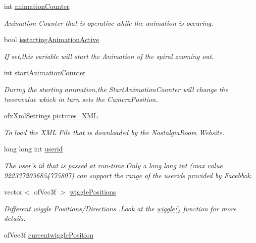 \begin{DoxyCompactItemize}
int \hyperlink{group___camera_ga21b16bdba744425519597fcb925df43a}{animation\-Counter}
\begin{DoxyCompactList}\small\item\em Animation Counter that is operative while the animation is occuring. \end{DoxyCompactList}\item 
bool \hyperlink{group___camera_gab8a277e1055730fb5d6786ce0c4804b2}{isstarting\-Animation\-Active}
\begin{DoxyCompactList}\small\item\em If set,this variable will start the Animation of the spiral zooming out. \end{DoxyCompactList}\item 
int \hyperlink{group___camera_ga577bf117cf10109de967ea0d3ca17f1f}{start\-Animation\-Counter}
\begin{DoxyCompactList}\small\item\em During the starting animation,the Start\-Animation\-Counter will change the tweenvalue which in turn sets the Camera\-Position. \end{DoxyCompactList}\item 
ofx\-Xml\-Settings \hyperlink{classtest_app_a85133f49103cfa002f39d882f7168236}{pictures\-\_\-\-X\-M\-L}
\begin{DoxyCompactList}\small\item\em To load the X\-M\-L File that is downloaded by the Nostalgia\-Room Website. \end{DoxyCompactList}\item 
long long int \hyperlink{classtest_app_a6ae76dc97fbeee00755f4a6cd6b87e19}{userid}
\begin{DoxyCompactList}\small\item\em The user's id that is passed at run-\/time.\-Only a long long int (max value 9223372036854775807) can support the range of the userids provided by Facebbok. \end{DoxyCompactList}\item 
vector$<$ of\-Vec3f $>$ \hyperlink{group___wiggle_ga5495d37f44bb3e3b00a04ad5910e0a6b}{wiggle\-Positions}
\begin{DoxyCompactList}\small\item\em Different wiggle Positions/\-Directions .Look at the \hyperlink{group___wiggle_gacd718eb54b9dc2b45e463414c24de6b9}{wiggle()} function for more details. \end{DoxyCompactList}\item 
of\-Vec3f \hyperlink{group___wiggle_gaf81358868ae15faab1974ec074b1509f}{currentwiggle\-Position}

\end{DoxyCompactItemize}
